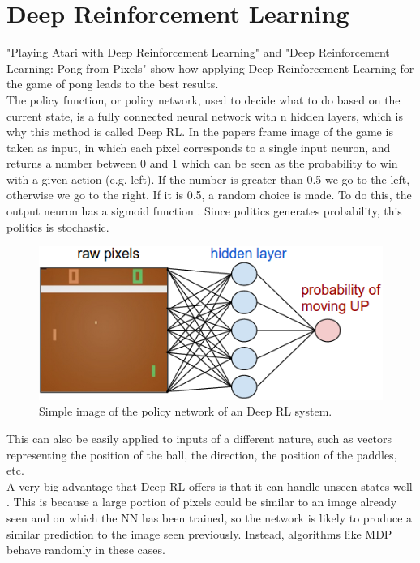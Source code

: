 \section{Deep Reinforcement Learning}

"Playing Atari with Deep Reinforcement Learning" \cite{mnih2013playing} and "Deep Reinforcement Learning: Pong from Pixels" \cite{karpathy2016deep} show how applying Deep Reinforcement Learning for the game of pong leads to the best results.\\

The policy function, or policy network, used to decide what to do based on the current state, is a fully connected neural network with n hidden layers, which is why this method is called Deep RL. In the papers frame image of the game is taken as input, in which each pixel corresponds to a single input neuron, and returns a number between 0 and 1 which can be seen as the probability to win with a given action (e.g. left). If the number is greater than 0.5 we go to the left, otherwise we go to the right. If it is 0.5, a random choice is made. To do this, the output neuron has a sigmoid function \cite{mnih2013playing}\cite{karpathy2016deep}.
Since politics generates probability, this politics is stochastic.

\begin{figure}[ht]
    \centering
    \includegraphics[scale=0.4]{images/DRL_network.png}
    \caption{Simple image of the policy network of an Deep RL system.}
    \label{fig:DRL_network}
\end{figure}

This can also be easily applied to inputs of a different nature, such as vectors representing the position of the ball, the direction, the position of the paddles, etc. \\

A very big advantage that Deep RL offers is that it can handle unseen states well \cite{mnih2013playing}\cite{karpathy2016deep}. This is because a large portion of pixels could be similar to an image already seen and on which the NN has been trained, so the network is likely to produce a similar prediction to the image seen previously. Instead, algorithms like MDP behave randomly in these cases. \\


